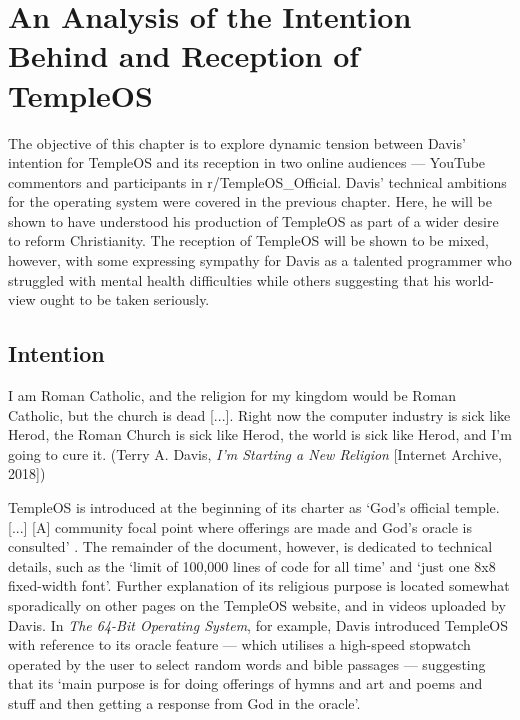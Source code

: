 \documentclass[Draft.tex]{subfiles}
\begin{document}
\chapter{An Analysis of the Intention Behind and Reception of TempleOS}

The objective of this chapter is to explore dynamic tension between Davis'
intention for TempleOS and its reception in two online audiences ---
YouTube commentors and participants in r/TempleOS\_Official.
Davis' technical ambitions for the operating system were covered in the
previous chapter.
Here, he will be shown to have understood his production of TempleOS
as part of a wider desire to reform Christianity.
The reception of TempleOS will be shown to be mixed, however,
with some expressing sympathy for Davis as a talented programmer who
struggled with mental health difficulties while others suggesting that
his world-view ought to be taken seriously.

\section*{Intention}

\begin{displayquote}
  I am Roman Catholic, and the religion for my kingdom
  would be Roman Catholic, but the church is dead [...].
  Right now the computer industry is sick like Herod,
  the Roman Church is sick like Herod,
  the world is sick like Herod, and I'm going to cure it.
	(Terry A. Davis, \textit{I'm Starting a New Religion} [Internet Archive, 2018])
\end{displayquote}

TempleOS is introduced at the beginning of its charter as
`God's official temple. [...] [A] community focal point
where offerings are made and God's oracle is consulted' \parencite{Charter}.
The remainder of the document, however, is dedicated to technical details,
such as the `limit of 100,000 lines of code for all time'
and `just one 8x8 fixed-width font'.
Further explanation of its religious purpose is located somewhat sporadically
on other pages on the TempleOS website, and in videos uploaded by Davis.
In \textit{The 64-Bit Operating System}, for example,
Davis \parencite*{64-Bit} introduced TempleOS
with reference to its oracle feature --- which utilises a high-speed
stopwatch operated by the user to select random words and bible passages ---
suggesting that its `main purpose is for doing offerings of hymns and art
and poems and stuff and then getting a response from God in the oracle'.
\end{document}
